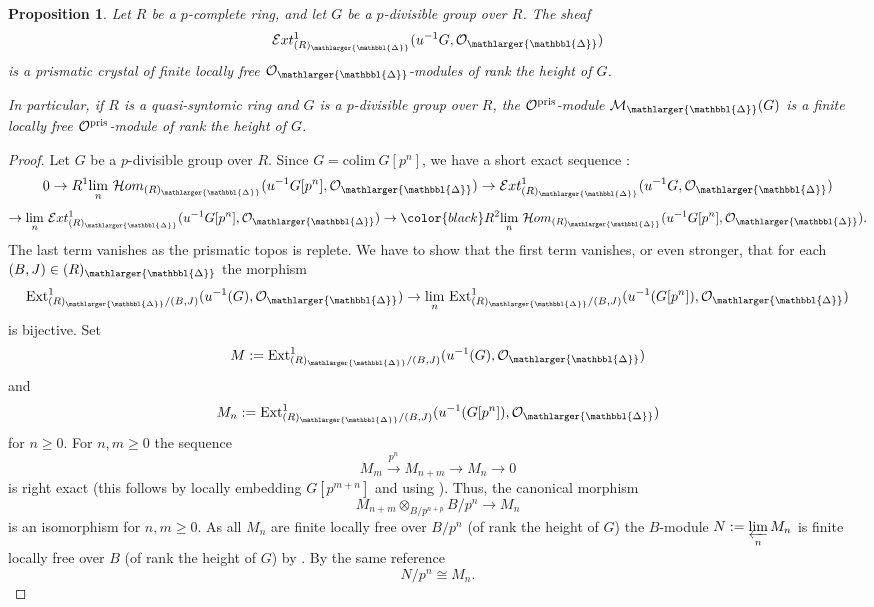 \documentclass{amsart}
\newcommand{\prism}{{\mathlarger{\mathbbl{\Delta}}}}
\theoremstyle{plain}
\newtheorem{proposition}[theorem]{Proposition}
\theoremstyle{definition}
\newcommand{\Ext}{\mathcal{E}xt}
\newcommand{\purple}[1]{{\color{black} #1}}
\newcommand{\blue}[1]{{\color{black}#1}}
\begin{document}
\begin{proposition}  \label{sec:divid-prism-dieud-proposition-ext-crystal}
	Let $R$ be a $p$-complete ring, and let $G$ be a $p$-divisible group over $R$. The sheaf $$\Ext_{(R)_{\prism}}^1(u^{-1}G,\mathcal{O}_{\prism})$$ is a prismatic crystal of finite locally free $\mathcal{O}_{\prism}$-modules of rank the height of $G$.
	
	\purple{In particular, if $R$ is a quasi-syntomic ring and $G$ is a $p$-divisible group over $R$, the $\mathcal{O}^{\rm pris}$-module $\mathcal{M}_{\prism}(G)$ is a finite locally free $\mathcal{O}^{\rm pris}$-module of rank the height of $G$.} 
\end{proposition}
\begin{proof}
	Let $G$ be a $p$-divisible group over $R$. Since $G=\mathrm{colim}~G[p^n]$, we have a short exact sequence :
	\[  0 \to R^1 \underset{n} \lim ~ \mathcal{H}om_{(R)_{\prism}}(u^{-1} G[p^n], \mathcal{O}_{\prism}) \to \Ext_{(R)_{\prism}}^1(u^{-1} G, \mathcal{O}_{\prism}) \]
        \[\to   \underset{n} \lim  ~ \Ext_{(R)_{\prism}}^1(u^{-1} G[p^n], \mathcal{O}_{\prism}) \to \blue{R^2 \underset{n} \lim ~ \mathcal{H}om_{(R)_{\prism}}(u^{-1} G[p^n], \mathcal{O}_{\prism})}. \]
          \blue{The last term vanishes as the prismatic topos is replete.} We have to show that the first term vanishes, or even stronger, that for each $(B,J)\in (R)_{\prism}$ the morphism
          $$
          \mathrm{Ext}^1_{(R)_\prism/(B,J)}(u^{-1}(G),\mathcal{O}_\prism)\to \underset{n}\lim ~ \mathrm{Ext}^1_{(R)_\prism/(B,J)}(u^{-1}(G[p^n]),\mathcal{O}_\prism)
          $$
          is bijective.
          Set
          $$
          M:=\mathrm{Ext}^1_{(R)_\prism/(B,J)}(u^{-1}(G),\mathcal{O}_\prism)
          $$
          and
          $$
          M_n:=\mathrm{Ext}^1_{(R)_\prism/(B,J)}(u^{-1}(G[p^n]),\mathcal{O}_\prism)
          $$
          for $n\geq 0$. For $n,m\geq 0$ the sequence
          $$
          M_{m}\xrightarrow{p^n} M_{n+m}\to M_n\to 0
          $$
          is right exact (this follows by locally embedding $G[p^{m+n}]$ and using ). Thus, the canonical morphism
          $$
          M_{n+m}\otimes_{B/p^{n+p}} B/p^n\to M_n
          $$
          is an isomorphism for $n,m\geq 0$. As all $M_n$ are finite locally free over $B/p^n$ (of rank the height of $G$) the $B$-module $N:=\varprojlim\limits_{n} M_n$ is finite locally free over $B$ (of rank the height of $G$) by \cite[Tag 0D4B]{stacks_project}. By the same reference
          $$
          N/p^n\cong M_n.
          $$

\end{proof}
\end{document}
